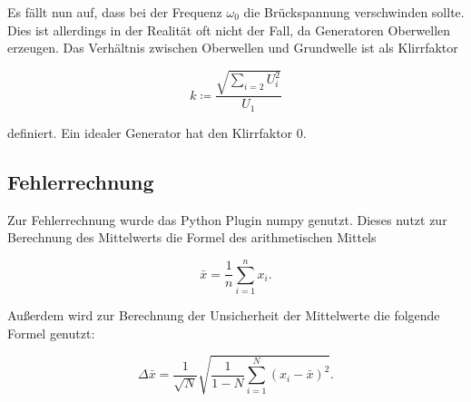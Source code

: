 Es fällt nun auf, dass bei der Frequenz $\omega_0$ die Brückspannung verschwinden sollte.
Dies ist allerdings in der Realität oft nicht der Fall, da Generatoren Oberwellen erzeugen.
Das Verhältnis zwischen Oberwellen und Grundwelle ist als Klirrfaktor

\begin{equation}
    k \coloneq \frac{\sqrt{\sum_{i=2} U_i^2}}{U_1}
    \label{eqn:wien_klirr}
\end{equation}

definiert. Ein idealer Generator hat den Klirrfaktor 0.

\subsection{Fehlerrechnung}

Zur Fehlerrechnung wurde das Python Plugin numpy \cite{numpy} genutzt.
Dieses nutzt zur Berechnung des Mittelwerts die Formel des arithmetischen Mittels

\begin{equation}
    \bar{x} = \frac{1}{n} \sum_{i=1}^n x_i.
    \label{eqn:mittel}
\end{equation}

Außerdem wird zur Berechnung der Unsicherheit der Mittelwerte die folgende Formel genutzt:

\begin{equation}
    \Delta \bar{x} = \frac{1}{\sqrt{N}} \sqrt{\frac{1}{1-N} \sum_{i=1}^N (x_i-\bar{x})^2}.
    \label{eqn:fehler}
\end{equation}

